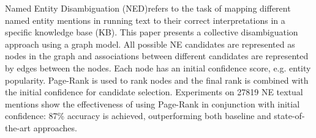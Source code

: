 Named Entity Disambiguation (NED)refers to the task of mapping different named entity mentions in running text to their correct interpretations in a specific knowledge base (KB). This paper presents a collective disambiguation approach using a graph model. All possible NE candidates are represented as nodes in the graph and associations between different candidates are represented by edges between the nodes. Each node has an initial confidence score, e.g. entity popularity. Page-Rank is used to rank nodes and the final rank is combined with the initial confidence for candidate selection. Experiments on 27819 NE textual mentions show the effectiveness of using Page-Rank in conjunction with initial confidence: 87\% accuracy is achieved, outperforming both baseline and state-of-the-art approaches.
